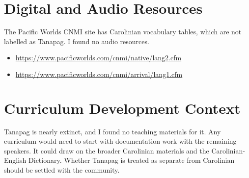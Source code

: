 \documentclass[12pt]{article}
\begin{document}
\section{Digital and Audio Resources}
The Pacific Worlds CNMI site has Carolinian vocabulary tables, which are not labelled as Tanapag. I found no audio resources.
\begin{itemize}
\item \url{https://www.pacificworlds.com/cnmi/native/lang2.cfm}
\item \url{https://www.pacificworlds.com/cnmi/arrival/lang1.cfm}
\end{itemize}

\section{Curriculum Development Context}
Tanapag is nearly extinct, and I found no teaching materials for it. Any curriculum would need to start with documentation work with the remaining speakers. It could draw on the broader Carolinian materials and the Carolinian-English Dictionary. Whether Tanapag is treated as separate from Carolinian should be settled with the community.
\end{document}
